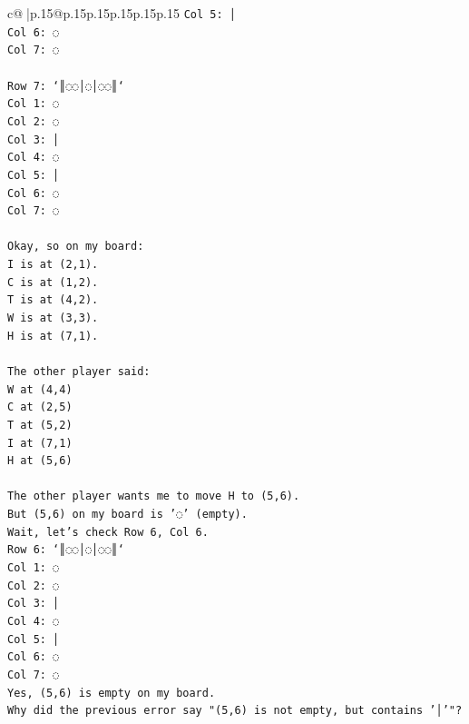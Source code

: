 \documentclass{article}
\begin{document}
{\begin{supertabular}{c@{$\;$}|p{.15\linewidth}@{}p{.15\linewidth}p{.15\linewidth}p{.15\linewidth}p{.15\linewidth}p{.15\linewidth}}
{{{\texttt{Col 5: │} \\
\texttt{Col 6: ◌} \\
\texttt{Col 7: ◌} \\
\\ 
\texttt{Row 7: `║◌◌│◌│◌◌║`} \\
\texttt{Col 1: ◌} \\
\texttt{Col 2: ◌} \\
\texttt{Col 3: │} \\
\texttt{Col 4: ◌} \\
\texttt{Col 5: │} \\
\texttt{Col 6: ◌} \\
\texttt{Col 7: ◌} \\
\\ 
\texttt{Okay, so on my board:} \\
\texttt{I is at (2,1).} \\
\texttt{C is at (1,2).} \\
\texttt{T is at (4,2).} \\
\texttt{W is at (3,3).} \\
\texttt{H is at (7,1).} \\
\\ 
\texttt{The other player said:} \\
\texttt{W at (4,4)} \\
\texttt{C at (2,5)} \\
\texttt{T at (5,2)} \\
\texttt{I at (7,1)} \\
\texttt{H at (5,6)} \\
\\ 
\texttt{The other player wants me to move H to (5,6).} \\
\texttt{But (5,6) on my board is '◌' (empty).} \\
\texttt{Wait, let's check Row 6, Col 6.} \\
\texttt{Row 6: `║◌◌│◌│◌◌║`} \\
\texttt{Col 1: ◌} \\
\texttt{Col 2: ◌} \\
\texttt{Col 3: │} \\
\texttt{Col 4: ◌} \\
\texttt{Col 5: │} \\
\texttt{Col 6: ◌} \\
\texttt{Col 7: ◌} \\
\texttt{Yes, (5,6) is empty on my board.} \\
\texttt{Why did the previous error say "(5,6) is not empty, but contains '│'"?} \\
}}}
\end{supertabular}}
\end{document}
